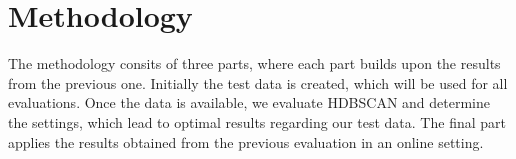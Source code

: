 \section{Methodology}

The methodology consits of three parts, where each part builds upon the results from the previous one. Initially the test data is created, which will be used for all evaluations. Once the data is available, we evaluate HDBSCAN and determine the settings, which lead to optimal results regarding our test data. The final part applies the results obtained from the previous evaluation in an online setting.       



